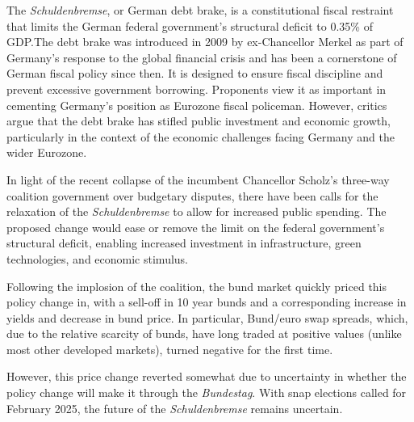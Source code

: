 \documentclass[10pt]{article}
\begin{document}
The \textit{Schuldenbremse}, or German debt brake, is a constitutional fiscal restraint that limits the German federal government's structural deficit to 0.35\% of GDP.\@ The debt brake was introduced in 2009 by ex-Chancellor Merkel as part of Germany's response to the global financial crisis and has been a cornerstone of German fiscal policy since then. It is designed to ensure fiscal discipline and prevent excessive government borrowing. Proponents view it as important in cementing Germany's position as Eurozone fiscal policeman. However, critics argue that the debt brake has stifled public investment and economic growth, particularly in the context of the economic challenges facing Germany and the wider Eurozone\autocite{pitelWillFriedrichMerz2024}.

In light of the recent collapse of the incumbent Chancellor Scholz's three-way coalition government over budgetary disputes\autocite{chazanGermanCoalitionGovernment2024}, there have been calls for the relaxation of the \textit{Schuldenbremse} to allow for increased public spending. The proposed change would ease or remove the limit on the federal government's structural deficit, enabling increased investment in infrastructure, green technologies, and economic stimulus\autocite{pitelWillFriedrichMerz2024}.

Following the implosion of the coalition, the bund market quickly priced this policy change in, with a sell-off in 10 year bunds and a corresponding increase in yields and decrease in bund price. In particular, Bund/euro swap spreads, which, due to the relative scarcity of bunds, have long traded at positive values (unlike most other developed markets), turned negative for the first time.

However, this price change reverted somewhat due to uncertainty in whether the policy change will make it through the \textit{Bundestag}\autocite{chazanGermanBondInvestors2024}. With snap elections called for February 2025, the future of the \textit{Schuldenbremse} remains uncertain.

\
\end{document}

